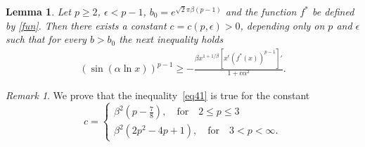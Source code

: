 \documentclass{amsart}
\newtheorem{lemma}[theorem]{Lemma}
\theoremstyle{definition}
\theoremstyle{remark}
\newtheorem{remark}[theorem]{Remark}
\numberwithin{equation}{section}
\begin{document}
\begin{lemma} \label{lem4}
	Let  $p\geq 2$, $\epsilon<p-1$, %
	 $ b_0=e^{\sqrt2 \pi  \beta (p-1)}$ and the function $f^*$ be defined by \eqref{fun}. Then 
 there exists a constant $c=c(p,\epsilon)>0$, depending only on $p$ and $\epsilon$ such that 
  for every $b>b_0$ the next inequality holds 
  \begin{align}\label{eq41}
(\sin(\alpha\ln x))^{p-1}\geq 
- \frac{\beta x^{1+1/\beta}\left[x^\epsilon (f^*(x))^{p-1} \right]'} {1+c\alpha^2}.
\end{align}
\end{lemma}
\begin{remark}
We prove that the inequality~\ref{eq41} is true for the constant
 \begin{equation*}
  c= 
    \begin{cases}
           \beta^2\left(p-\frac{7}{8}\right), \quad\mbox{for}\quad 2\le p\le3\\
         \beta^2 \left(2p^2-4p+1\right), \quad\mbox{for}\quad 3<p< \infty.
        \end{cases}
 \end{equation*}
  \end{remark}	
		
\end{document}
